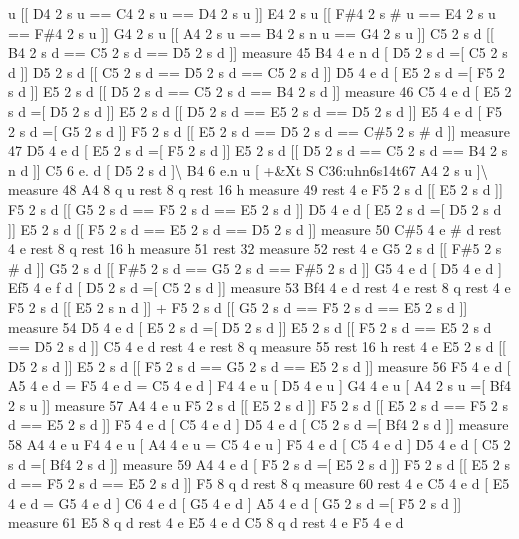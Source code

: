 u \mbox{[}\mbox{[} D4 2 s u == C4 2 s u == D4 2 s u \mbox{]}\mbox{]} E4 2 s u \mbox{[}\mbox{[} F\#4 2 s \# u == E4 2 s u == F\#4 2 s u \mbox{]}\mbox{]} G4 2 s u \mbox{[}\mbox{[} A4 2 s u == B4 2 s n u == G4 2 s u \mbox{]}\mbox{]} C5 2 s d \mbox{[}\mbox{[} B4 2 s d == C5 2 s d == D5 2 s d \mbox{]}\mbox{]} measure 45 B4 4 e n d \mbox{[} D5 2 s d =\mbox{[} C5 2 s d \mbox{]}\mbox{]} D5 2 s d \mbox{[}\mbox{[} C5 2 s d == D5 2 s d == C5 2 s d \mbox{]}\mbox{]} D5 4 e d \mbox{[} E5 2 s d =\mbox{[} F5 2 s d \mbox{]}\mbox{]} E5 2 s d \mbox{[}\mbox{[} D5 2 s d == C5 2 s d == B4 2 s d \mbox{]}\mbox{]} measure 46 C5 4 e d \mbox{[} E5 2 s d =\mbox{[} D5 2 s d \mbox{]}\mbox{]} E5 2 s d \mbox{[}\mbox{[} D5 2 s d == E5 2 s d == D5 2 s d \mbox{]}\mbox{]} E5 4 e d \mbox{[} F5 2 s d =\mbox{[} G5 2 s d \mbox{]}\mbox{]} F5 2 s d \mbox{[}\mbox{[} E5 2 s d == D5 2 s d == C\#5 2 s \# d \mbox{]}\mbox{]} measure 47 D5 4 e d \mbox{[} E5 2 s d =\mbox{[} F5 2 s d \mbox{]}\mbox{]} E5 2 s d \mbox{[}\mbox{[} D5 2 s d == C5 2 s d == B4 2 s n d \mbox{]}\mbox{]} C5 6 e. d \mbox{[} D5 2 s d \mbox{]}\textbackslash{} B4 6 e.\+n u \mbox{[} +\&Xt S C36\+:uhn6s14t67 A4 2 s u \mbox{]}\textbackslash{} measure 48 A4 8 q u rest 8 q rest 16 h measure 49 rest 4 e F5 2 s d \mbox{[}\mbox{[} E5 2 s d \mbox{]}\mbox{]} F5 2 s d \mbox{[}\mbox{[} G5 2 s d == F5 2 s d == E5 2 s d \mbox{]}\mbox{]} D5 4 e d \mbox{[} E5 2 s d =\mbox{[} D5 2 s d \mbox{]}\mbox{]} E5 2 s d \mbox{[}\mbox{[} F5 2 s d == E5 2 s d == D5 2 s d \mbox{]}\mbox{]} measure 50 C\#5 4 e \# d rest 4 e rest 8 q rest 16 h measure 51 rest 32 measure 52 rest 4 e G5 2 s d \mbox{[}\mbox{[} F\#5 2 s \# d \mbox{]}\mbox{]} G5 2 s d \mbox{[}\mbox{[} F\#5 2 s d == G5 2 s d == F\#5 2 s d \mbox{]}\mbox{]} G5 4 e d \mbox{[} D5 4 e d \mbox{]} Ef5 4 e f d \mbox{[} D5 2 s d =\mbox{[} C5 2 s d \mbox{]}\mbox{]} measure 53 Bf4 4 e d rest 4 e rest 8 q rest 4 e F5 2 s d \mbox{[}\mbox{[} E5 2 s n d \mbox{]}\mbox{]} + F5 2 s d \mbox{[}\mbox{[} G5 2 s d == F5 2 s d == E5 2 s d \mbox{]}\mbox{]} measure 54 D5 4 e d \mbox{[} E5 2 s d =\mbox{[} D5 2 s d \mbox{]}\mbox{]} E5 2 s d \mbox{[}\mbox{[} F5 2 s d == E5 2 s d == D5 2 s d \mbox{]}\mbox{]} C5 4 e d rest 4 e rest 8 q measure 55 rest 16 h rest 4 e E5 2 s d \mbox{[}\mbox{[} D5 2 s d \mbox{]}\mbox{]} E5 2 s d \mbox{[}\mbox{[} F5 2 s d == G5 2 s d == E5 2 s d \mbox{]}\mbox{]} measure 56 F5 4 e d \mbox{[} A5 4 e d = F5 4 e d = C5 4 e d \mbox{]} F4 4 e u \mbox{[} D5 4 e u \mbox{]} G4 4 e u \mbox{[} A4 2 s u =\mbox{[} Bf4 2 s u \mbox{]}\mbox{]} measure 57 A4 4 e u F5 2 s d \mbox{[}\mbox{[} E5 2 s d \mbox{]}\mbox{]} F5 2 s d \mbox{[}\mbox{[} E5 2 s d == F5 2 s d == E5 2 s d \mbox{]}\mbox{]} F5 4 e d \mbox{[} C5 4 e d \mbox{]} D5 4 e d \mbox{[} C5 2 s d =\mbox{[} Bf4 2 s d \mbox{]}\mbox{]} measure 58 A4 4 e u F4 4 e u \mbox{[} A4 4 e u = C5 4 e u \mbox{]} F5 4 e d \mbox{[} C5 4 e d \mbox{]} D5 4 e d \mbox{[} C5 2 s d =\mbox{[} Bf4 2 s d \mbox{]}\mbox{]} measure 59 A4 4 e d \mbox{[} F5 2 s d =\mbox{[} E5 2 s d \mbox{]}\mbox{]} F5 2 s d \mbox{[}\mbox{[} E5 2 s d == F5 2 s d == E5 2 s d \mbox{]}\mbox{]} F5 8 q d rest 8 q measure 60 rest 4 e C5 4 e d \mbox{[} E5 4 e d = G5 4 e d \mbox{]} C6 4 e d \mbox{[} G5 4 e d \mbox{]} A5 4 e d \mbox{[} G5 2 s d =\mbox{[} F5 2 s d \mbox{]}\mbox{]} measure 61 E5 8 q d rest 4 e E5 4 e d C5 8 q d rest 4 e F5 4 e d 